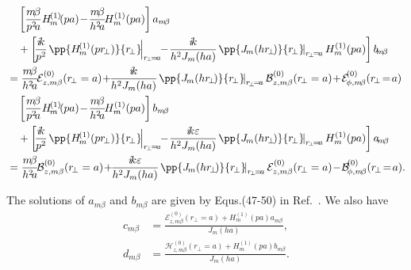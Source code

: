 \documentclass[]{report}
\begin{document}
\begin{align}
&\quad \left[\frac{m\! \beta}{p^2\! a} H\!_m^{(1)}\!(pa) \!-\! \frac{m\! \beta}{h^2\! a}\!H_m^{(1)}(pa) \right] a_{m\!\beta}\nonumber\\
&\quad +\left[\! \frac{i\!k}{p^2}\! \left. \pp{H\!_m^{( 1 )}(p r\!_\perp)}{r\!_\perp}\! \right|_{r\!_\perp\! =\! a}\!\!-\! \frac{i\!k}{h^2J_m(ha)}\! \left. \pp{J\!_m(h r\!_\perp \!)}{r\!_\perp}\! \right|_{r\!_\perp\! =\! a} H_m^{(1)}(pa) \right]b\!_{m\!\beta} \nonumber\\
&= \frac{m\! \beta}{h^2\! a}\! \mathcal{E}_{z,m\beta}^{(0)}(r\!_\perp =a ) \!+\! \! \frac{i\!k}{h^2J_m(ha)}\! \left. \pp{J\!_m(h r\!_\perp \!)}{r\!_\perp}\! \right|_{r\!_\perp\! =\! a}\mathcal{B}_{z,m\beta}^{(0)}(r\!_\perp =a )  \!+\!\mathcal{E}\! _{\phi,m\! \beta}^{(0)}(r\!_\perp\! =\! a )\\
&\quad \left[\frac{m\! \beta}{p^2\! a} H\!_m^{(1)}\!(pa) \!-\! \frac{m\! \beta}{h^2\! a}\!H_m^{(1)}(pa) \right] b_{m\!\beta}\nonumber\\
&\quad +\left[\! \frac{i\!k}{p^2}\! \left. \pp{H\!_m^{( 1 )}(p r\!_\perp)}{r\!_\perp}\! \right|_{r\!_\perp\! =\! a}\!\!-\! \frac{i\!k\varepsilon}{h^2J_m(ha)}\! \left. \pp{J\!_m(h r\!_\perp \!)}{r\!_\perp}\! \right|_{r\!_\perp\! =\! a} H_m^{(1)}(pa) \right]a\!_{m\!\beta} \nonumber\\
&= \frac{m\! \beta}{h^2\! a}\! \mathcal{B}_{z,m\beta}^{(0)}(r\!_\perp =a ) \!+\! \! \frac{i\!k\varepsilon}{h^2J_m(ha)}\! \left. \pp{J\!_m(h r\!_\perp \!)}{r\!_\perp}\! \right|_{r\!_\perp\! =\! a}\mathcal{E}_{z,m\beta}^{(0)}(r\!_\perp =a )  \!-\!\mathcal{B}\! _{\phi,m\! \beta}^{(0)}(r\!_\perp\! =\! a ).
\end{align}

The solutions of $a_{m\beta}$ and $b_{m\beta}$ are given by Equs.(47-50) in Ref.~\cite{Klimov2004}. We also have
\begin{align}
c_{m\beta} &= \frac{\mathcal{E}_{z,m\beta}^{(0)}(r\!_\perp\!=\!a)+ H_m^{(1)}(pa)a_{m\beta}}{J_m(ha)},\\
d_{m\beta} &= \frac{\mathcal{H}_{z,m\beta}^{(0)}(r\!_\perp\!=\!a)+ H_m^{(1)}(pa)b_{m\beta}}{J_m(ha)}.
\end{align}
\end{document}
